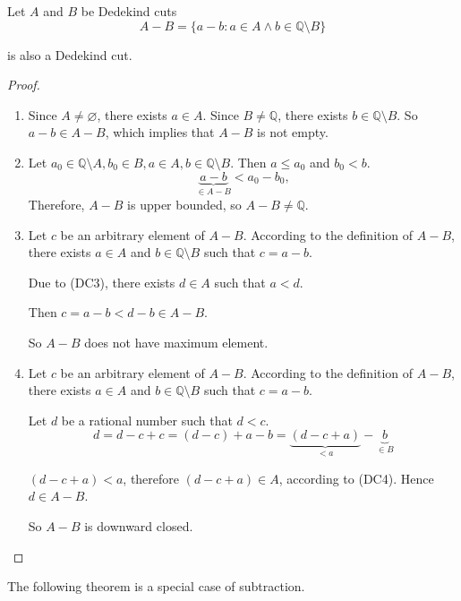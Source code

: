 \begin{theorem}[Subtraction]
    \par Let $A$ and $B$ be Dedekind cuts
    \[
        A - B = \{ a - b: a\in A\land b\in\mathbb{Q}\setminus B \}
    \]
    \par is also a Dedekind cut.
\end{theorem}

\begin{proof}
    \begin{enumerate}[label = (\roman*)]
        \item Since $A\ne\varnothing$, there exists $a\in A$. Since $B\ne\mathbb{Q}$, there exists $b\in\mathbb{Q}\setminus B$. So $a - b\in A - B$, which implies that $A - B$ is not empty.
        \item Let $a_{0}\in\mathbb{Q}\setminus A, b_{0}\in B, a\in A, b\in\mathbb{Q}\setminus B$. Then $a\le a_{0}$ and $b_{0} < b$.
              \[
                  \underbrace{a - b}_{\in A - B} < a_{0} - b_{0},
              \]
              Therefore, $A - B$ is upper bounded, so $A - B\ne\mathbb{Q}$.
        \item Let $c$ be an arbitrary element of $A - B$. According to the definition of $A - B$, there exists $a\in A$ and $b\in\mathbb{Q}\setminus B$ such that $c = a - b$.
              \par Due to (DC3), there exists $d\in A$ such that $a < d$.
              \par Then $c = a - b < d - b \in A - B$.
              \par So $A - B$ does not have maximum element.
        \item Let $c$ be an arbitrary element of $A - B$. According to the definition of $A - B$, there exists $a\in A$ and $b\in\mathbb{Q}\setminus B$ such that $c = a - b$.
              \par Let $d$ be a rational number such that $d < c$.
              \[
                  d = d - c + c = (d - c) + a - b = \underbrace{(d - c + a)}_{< a} - \underbrace{b}_{\in B}
              \]
              \par $(d - c + a) < a$, therefore $(d - c + a)\in A$, according to (DC4). Hence $d\in A - B$.
              \par So $A - B$ is downward closed.
    \end{enumerate}
\end{proof}

\par The following theorem is a special case of subtraction.

